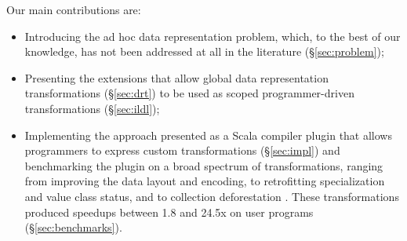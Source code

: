 Our main contributions are:
\begin{itemize}
  \item Introducing the ad hoc data representation problem, which, to the best of our knowledge, has not been addressed at all in the literature (\S\ref{sec:problem});
  \item Presenting the extensions that allow global data representation transformations (\S\ref{sec:drt}) to be used as scoped programmer-driven transformations (\S\ref{sec:ildl});
  \item Implementing the approach presented as a Scala compiler plugin \cite{ildl-plugin} that allows programmers to express custom transformations (\S\ref{sec:impl}) and benchmarking the plugin on a broad spectrum of transformations, ranging from improving the data layout and encoding, to retrofitting specialization and value class status, and to collection deforestation \cite{wadler-deforestation}. These transformations produced  speedups between 1.8 and 24.5x on user programs (\S\ref{sec:benchmarks}).
\end{itemize}

